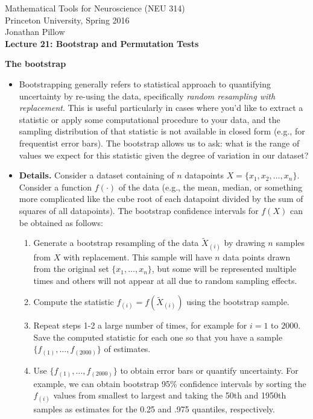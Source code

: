 \documentclass[11pt]{article}
\begin{document}
\begin{center}
Mathematical Tools for Neuroscience (NEU 314)\\
Princeton University, Spring 2016 \\
Jonathan Pillow \\
\vspace{1em}
{\large \textbf{Lecture 21: Bootstrap and Permutation Tests}}
\end{center}

{\bf The bootstrap}

\begin{itemize}
\item Bootstrapping generally refers to statistical approach to
  quantifying uncertainty by re-using the data, specifically {\it
    random resampling with replacement}.  This is useful particularly
  in cases where you'd like to extract a statistic or apply some
  computational procedure to your data, and the sampling distribution
  of that statistic is not available in closed form (e.g., for
  frequentist error bars).  The bootstrap allows us to ask: what is
  the range of values we expect for this statistic given the degree of
  variation in our dataset?

\item {\bf Details.}  Consider a dataset containing of $n$ datapoints
  $X = \{x_1, x_2, \ldots, x_n\}$. Consider a function $f(\cdot)$
  of the data (e.g., the mean, median, or something more complicated
  like the cube root of each datapoint divided by the sum of squares
  of all datapoints).  The bootstrap confidence intervals for $f(X)$
  can be obtained as follows:
\begin{enumerate}
\item Generate a bootstrap resampling of the data $\tilde X_{(i)}$ by
  drawing $n$ samples from $X$ with replacement. This sample will have
  $n$ data points drawn from the original set $\{x_1, \ldots, x_n\}$,
  but some will be represented multiple times and others will not
  appear at all due to random sampling effects.
\item Compute the statistic $f_{(i)} = f(\tilde X_{(i)})$ using
  the bootstrap sample.
\item Repeat steps 1-2 a large number of times, for example for $i=1$ 
  to $2000$.  Save the computed statistic for each one so that you
  have a sample $\{f_{(1)}, \ldots, f_{(2000)} \}$ of estimates. 
\item Use $\{f_{(1)}, \ldots, f_{(2000)} \}$ to obtain error bars or
  quantify uncertainty.  For example, we can obtain bootstrap 95\%
  confidence intervals by sorting the $f_{(i)}$ values from smallest
  to largest and taking the 50th and 1950th samples as estimates for
  the 0.25 and .975 quantiles, respectively.


\end{enumerate}
\end{itemize}
\end{document}

